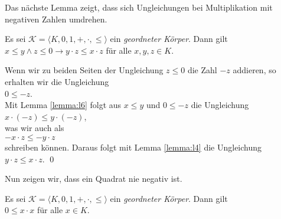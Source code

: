 Das nächste Lemma zeigt, dass sich Ungleichungen bei Multiplikation mit negativen Zahlen
umdrehen. 

\begin{Lemma} 
  Es sei  $\mathcal{K} = \langle K, 0, 1, +, \cdot, \leq \rangle$ ein \emph{geordneter Körper}.
  Dann gilt
  \\[0.2cm]
  \hspace*{1.3cm} $x \leq y \wedge z \leq 0 \rightarrow y \cdot z \leq x \cdot z$  
  \quad für alle $x,y,z \in K$.
\end{Lemma}

\proof
Wenn wir zu beiden Seiten der Ungleichung  $z \leq 0$ die Zahl $-z$ addieren, so erhalten wir
die Ungleichung
\\[0.2cm]
\hspace*{1.3cm}
 $0 \leq -z$.
\\[0.2cm]
Mit Lemma \ref{lemma:l6} folgt aus $x \leq y$ und $0 \leq -z$ die Ungleichung
\\[0.2cm]
\hspace*{1.3cm}
$x \cdot (-z) \leq y \cdot (-z)$,
\\[0.2cm]
was wir auch als
\\[0.2cm]
\hspace*{1.3cm}
$-x \cdot z \leq -y \cdot z$
\\[0.2cm]
schreiben können.  Daraus folgt mit Lemma \ref{lemma:l4} die Ungleichung
\\[0.2cm]
\hspace*{1.3cm}
$y \cdot z \leq x \cdot z$. \qed

Nun zeigen wir, dass ein Quadrat nie negativ ist.

\begin{Lemma} 
  Es sei  $\mathcal{K} = \langle K, 0, 1, +, \cdot, \leq \rangle$ ein \emph{geordneter Körper}.
  Dann gilt
  \\[0.2cm]
  \hspace*{1.3cm} $0 \leq x \cdot x$  
  \quad für alle $x \in K$.
\end{Lemma}

